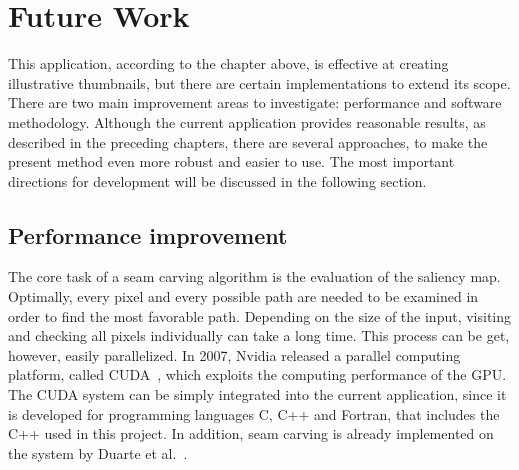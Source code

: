 \documentclass[draft,final]{vutinfth} %
\begin{document}
	\chapter{Future Work}
	\label{futureWork}
	This application, according to the chapter above, is effective at creating illustrative thumbnails, but there are certain implementations to extend its scope. 
	There are two main improvement areas to investigate: performance and software methodology.
	Although the current application provides reasonable results, as described in the preceding chapters, there are several approaches, to make the present method even more robust and easier to use.
	The most important directions for development will be discussed in the following section.
	
	\section{Performance improvement} 
	The core task of a seam carving algorithm is the evaluation of the saliency map.
	Optimally, every pixel and every possible path are needed to be examined in order to find the most favorable path.
	Depending on the size of the input, visiting and checking all pixels individually can take a long time.
	This process can be get, however, easily parallelized.
	In 2007, Nvidia released a parallel computing platform, called CUDA~\cite{Cook:2012:CPD:2430671}, which exploits the computing performance of the GPU.
	The CUDA system can be simply integrated into the current application, since it is developed for programming languages C, C++ and Fortran, that includes the C++ used in this project.
	In addition, seam carving is already implemented on the system by Duarte et al.~\cite{duarte2012accelerating}.
	
\end{document}
